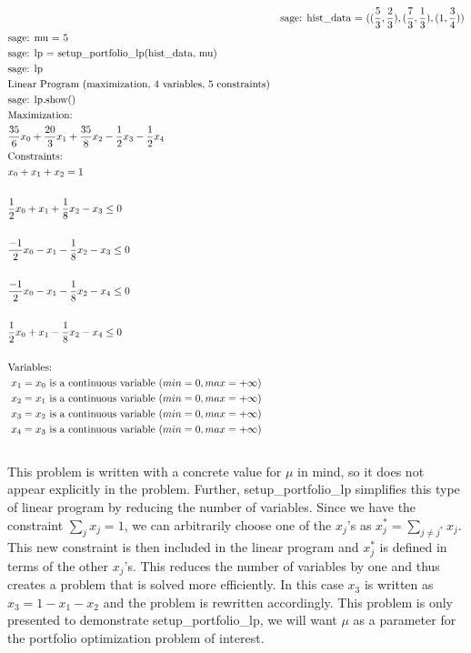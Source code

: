 \documentclass{article}
\begin{document}
\begin{align*}

&\text{}
&\text{sage: hist\_data = $((\frac{5}{3},\frac{2}{3}),(\frac{7}{3},\frac{1}{3}),(1,\frac{3}{4}))$}\\
&\text{sage: mu = 5}\\
&\text{sage: lp = setup\_portfolio\_lp(hist\_data, mu)}\\
&\text{sage: lp}\\
&\text{Linear Program (maximization, 4 variables, 5 constraints)}\\
&\text{sage: lp.show()}\\
&\text{Maximization:}\\
&\text{$\frac{35}{6} x_0 + \frac{20}{3} x_1 +\frac{35}{8} x_2 -\frac{1}{2} x_3 - \frac{1}{2} x_4$}\\

&\text{Constraints:}\\
&\text{$  x_0 + x_1 + x_2 = 1$}\\
\\
&\text{$\frac{1}{2} x_0 + x_1 + \frac{1}{8} x_2 - x_3 \leq 0 $}\\
\\
&\text{$\frac{-1}{2} x_0 - x_1 - \frac{1}{8} x_2 - x_3 \leq 0$}\\
\\
&\text{$\frac{-1}{2} x_0 - x_1 - \frac{1}{8} x_2 - x_4 \leq 0$}\\
\\
&\text{$\frac{1}{2} x_0 + x_1 -\frac{1}{8} x_2 - x_4 \leq 0$}\\
\\
&\text{Variables:}\\
&\text{  $x_1 = x_0$ is a continuous variable $(min=0, max=+\infty)$}\\
&\text{  $x_2 = x_1$ is a continuous variable $(min=0, max=+\infty)$}\\
&\text{  $x_3 = x_2$ is a continuous variable $(min=0, max=+\infty)$}\\
&\text{  $x_4 = x_3$ is a continuous variable $(min=0, max=+\infty)$}\\
\end{align*}
\\

This problem is written with a concrete value for $\mu$ in mind, so it does not appear explicitly in the problem. Further, {\selectfont setup\_portfolio\_lp} simplifies this type of linear program by reducing the number of variables. Since we have the constraint $\sum_{j} x_j = 1$, we can arbitrarily choose one of the $x_j$'s as $x_j^* = \sum_{j\ne j^*} x_j$. This new constraint is then included in the linear program and $x_j^*$ is defined in terms of the other $x_j$'s. This reduces the number of variables by one and thus creates a problem that is solved more efficiently. In this case $x_3$ is written as $x_3 = 1-x_1-x_2$ and the problem is rewritten accordingly. This problem is only presented to demonstrate {\selectfont setup\_portfolio\_lp}, we will want $\mu$ as a parameter for the portfolio optimization problem of interest. 
\end{document}
